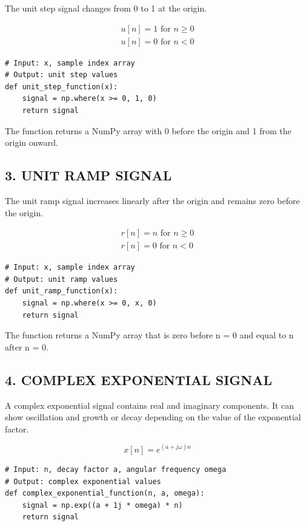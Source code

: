 \documentclass[12pt,a4paper]{article}
\begin{document}
The unit step signal changes from 0 to 1 at the origin.

\[
\begin{aligned}
u[n] = 1 \text{ for } n \geq 0 \\
u[n] = 0 \text{ for } n < 0
\end{aligned}
\]

\begin{lstlisting}[style=pythoncode]
# Input: x, sample index array
# Output: unit step values
def unit_step_function(x):
    signal = np.where(x >= 0, 1, 0)
    return signal
\end{lstlisting}

The function returns a NumPy array with 0 before the origin and 1 from the origin onward.

\subsection*{3. UNIT RAMP SIGNAL}

The unit ramp signal increases linearly after the origin and remains zero before the origin.

\[
\begin{aligned}
r[n] = n \text{ for } n \geq 0 \\
r[n] = 0 \text{ for } n < 0
\end{aligned}
\]

\begin{lstlisting}[style=pythoncode]
# Input: x, sample index array
# Output: unit ramp values
def unit_ramp_function(x):
    signal = np.where(x >= 0, x, 0)
    return signal
\end{lstlisting}

The function returns a NumPy array that is zero before n = 0 and equal to n after n = 0.

\subsection*{4. COMPLEX EXPONENTIAL SIGNAL}

A complex exponential signal contains real and imaginary components. It can show oscillation and growth or decay depending on the value of the exponential factor.

\[
x[n] = e^{(a + j\omega)n}
\]

\begin{lstlisting}[style=pythoncode]
# Input: n, decay factor a, angular frequency omega
# Output: complex exponential values
def complex_exponential_function(n, a, omega):
    signal = np.exp((a + 1j * omega) * n)
    return signal
\end{lstlisting}
\end{document}
